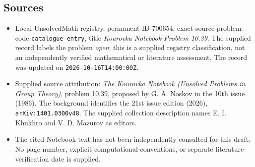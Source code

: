 \documentclass[11pt]{article}
\begin{document}
\subsection{Sources}
\begin{itemize}
\item Local UnsolvedMath registry, permanent ID \(700654\), exact source problem code \texttt{catalogue entry}, title \emph{Kourovka Notebook Problem 10.39}. The supplied record labels the problem \emph{open}; this is a supplied registry classification, not an independently verified mathematical or literature assessment. The record was updated on \texttt{2026-10-16T14:00:00Z}.
\item Supplied source attribution: \emph{The Kourovka Notebook (Unsolved Problems in Group Theory)}, problem 10.39, proposed by G. A. Noskov in the 10th issue (1986). The background identifies the 21st issue edition (2026), \texttt{arXiv:1401.0300v48}. The supplied collection description names E. I. Khukhro and V. D. Mazurov as editors.
\item The cited Notebook text has not been independently consulted for this draft. No page number, explicit computational conventions, or separate literature-verification date is supplied.
\end{itemize}
\end{document}
